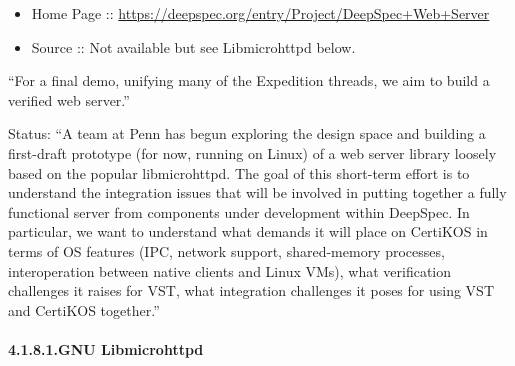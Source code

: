 \documentclass[12pt,twoside]{article}
\begin{document}
\begin{itemize}[noitemsep,topsep=\mdcompacttopsep]%

\item{}Home Page :: \href{https://deepspec.org/entry/Project/DeepSpec+Web+Server}{{\ttfamily https://\hspace{0pt}deepspec.\hspace{0pt}org/\hspace{0pt}entry/\hspace{0pt}Project/\hspace{0pt}DeepSpec+\hspace{0pt}Web+\hspace{0pt}Server}}%

\item{}Source :: Not available but see Libmicrohttpd below.%
\end{itemize}%

\noindent{}\textquotedblleft{}For a final demo, unifying many of the Expedition threads, we aim to
build a verified web server.\textquotedblright{}%

Status: \textquotedblleft{}A team at Penn has begun exploring the design space and
building a first-draft prototype (for now, running on Linux) of a web
server library loosely based on the popular libmicrohttpd.  The goal
of this short-term effort is to understand the integration issues that
will be involved in putting together a fully functional server from
components under development within DeepSpec.  In particular, we want
to understand what demands it will place on CertiKOS in terms of OS
features (IPC, network support, shared-memory processes,
interoperation between native clients and Linux VMs), what
verification challenges it raises for VST, what integration challenges
it poses for using VST and CertiKOS together.\textquotedblright{}%

\paragraph{4.1.8.1.\hspace*{0.5em}GNU Libmicrohttpd}\label{sec-gnu-libmicrohttpd}%
\end{document}
